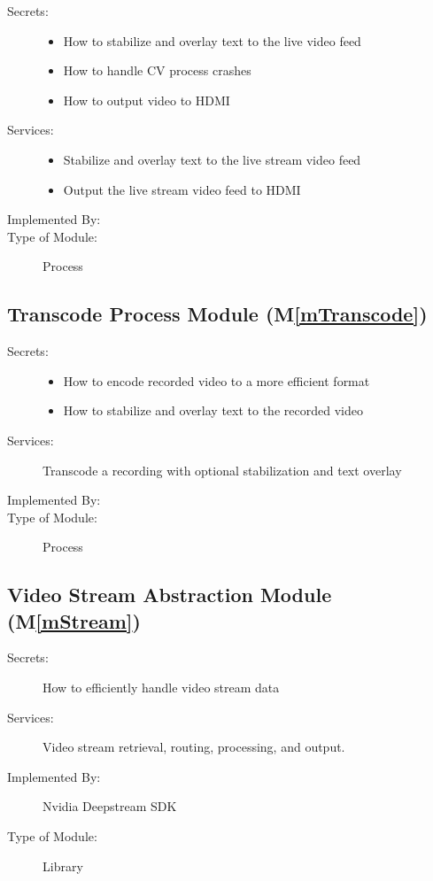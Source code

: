 \documentclass[12pt, titlepage]{article}
\newcommand{\mref}[1]{M\ref{#1}}
\begin{document}
\begin{description}
  \item[Secrets:] \leavevmode
        \begin{itemize}
          \item How to stabilize and overlay text to the live video feed
          \item How to handle CV process crashes
          \item How to output video to HDMI
        \end{itemize}
  \item[Services:] \leavevmode
        \begin{itemize}
          \item Stabilize and overlay text to the live stream video feed
          \item Output the live stream video feed to HDMI
        \end{itemize}
  \item[Implemented By:] \progname
  \item[Type of Module:] Process
\end{description}

\subsection{Transcode Process Module (\mref{mTranscode})}

\begin{description}
  \item[Secrets:] \leavevmode
        \begin{itemize}
          \item How to encode recorded video to a more efficient format
          \item How to stabilize and overlay text to the recorded video
        \end{itemize}
  \item[Services:] Transcode a recording with optional stabilization and text overlay
  \item[Implemented By:] \progname
  \item[Type of Module:] Process
\end{description}

\subsection{Video Stream Abstraction Module (\mref{mStream})}

\begin{description}
  \item[Secrets:] How to efficiently handle video stream data
  \item[Services:] Video stream retrieval, routing, processing, and output.
  \item[Implemented By:] Nvidia Deepstream SDK
  \item[Type of Module:] Library
\end{description}
\end{document}
